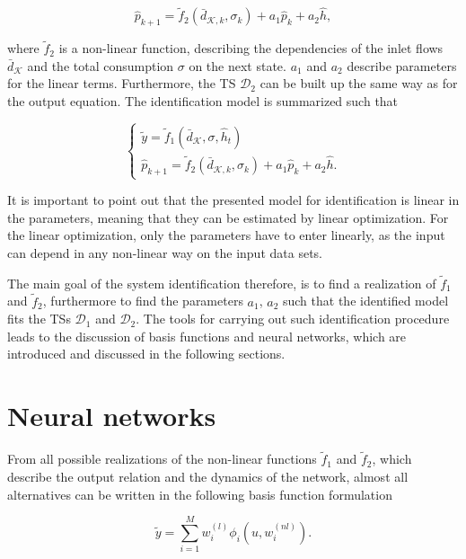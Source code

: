 \begin{equation}
\label{WT_matrixform_final_discrete2}
\hat{p}_{k+1} = \tilde{f}_2(\bar{d}_{\mathcal{K},k}, \sigma_k) + a_1 \hat{p}_k + a_2 \hat{h},
\end{equation}

where $\tilde{f}_2$ is a non-linear function, describing the dependencies of the inlet flows $\bar{d}_{\mathcal{K}}$ and the total consumption $\sigma$ on the next state. $a_1$ and $a_2$ describe parameters for the linear terms. Furthermore, the TS $\mathcal{D}_2$ can be built up the same way as for the output equation. The identification model is summarized such that 

\begin{equation}
\begin{cases}
  \label{identification_model}
    \tilde{y}  = \tilde{f}_1(\bar{d}_{\mathcal{K}}, \sigma, \hat{h}_t )\\
  \hat{p}_{k+1} = \tilde{f}_2(\bar{d}_{\mathcal{K},k}, \sigma_k) + a_1 \hat{p}_k + a_2 \hat{h} .
  \end{cases}
\end{equation} 

It is important to point out that the presented model for identification is linear in the parameters, meaning that they can be estimated by linear optimization. For the linear optimization, only the parameters have to enter linearly, as the input can depend in any non-linear way on the input data sets. 

The main goal of the system identification therefore, is to find a realization of $\tilde{f}_1$ and $\tilde{f}_2$, furthermore to find the parameters $a_1$, $a_2$ such that the identified model fits the TSs $\mathcal{D}_{1}$ and $\mathcal{D}_{2}$. The tools for carrying out such identification procedure leads to the discussion of basis functions and neural networks, which are introduced and discussed in the following sections.   

\section{Neural networks}
\label{neural_networks}

From all possible realizations of the non-linear functions $\tilde{f}_1$ and $\tilde{f}_2$, which describe the output relation and the dynamics of the network, almost all alternatives can be written in the following basis function formulation \cite{norgaard2003neural}

\begin{equation}
\label{basis_NN_eq}
\tilde{y} = \sum_{i = 1}^M w^{(l)}_i \phi_i(u, w^{(nl)}_i).
\end{equation}

